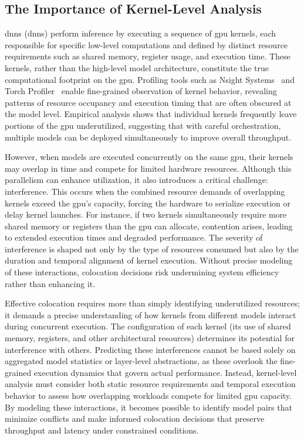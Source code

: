 \subsection{The Importance of Kernel-Level Analysis}

\acrlong{dnn}s (\acrshort{dnn}s) perform inference by executing a sequence of \acrshort{gpu} kernels, each responsible for specific low-level computations and defined by distinct resource requirements such as shared memory, register usage, and execution time. These kernels, rather than the high-level model architecture, constitute the true computational footprint on the \acrshort{gpu}. Profiling tools such as Nsight Systems~\cite{nsight_systems} and Torch Profiler~\cite{torch_profiler} enable fine-grained observation of kernel behavior, revealing patterns of resource occupancy and execution timing that are often obscured at the model level. Empirical analysis shows that individual kernels frequently leave portions of the \acrshort{gpu} underutilized, suggesting that with careful orchestration, multiple models can be deployed simultaneously to improve overall throughput.

However, when models are executed concurrently on the same \acrshort{gpu}, their kernels may overlap in time and compete for limited hardware resources. Although this parallelism can enhance utilization, it also introduces a critical challenge: interference. This occurs when the combined resource demands of overlapping kernels exceed the \acrshort{gpu}'s capacity, forcing the hardware to serialize execution or delay kernel launches. For instance, if two kernels simultaneously require more shared memory or registers than the \acrshort{gpu} can allocate, contention arises, leading to extended execution times and degraded performance. The severity of interference is shaped not only by the type of resources consumed but also by the duration and temporal alignment of kernel execution. Without precise modeling of these interactions, colocation decisions risk undermining system efficiency rather than enhancing it.

Effective colocation requires more than simply identifying underutilized resources; it demands a precise understanding of how kernels from different models interact during concurrent execution. The configuration of each kernel (its use of shared memory, registers, and other architectural resources) determines its potential for interference with others. Predicting these interferences cannot be based solely on aggregated model statistics or layer-level abstractions, as these overlook the fine-grained execution dynamics that govern actual performance. Instead, kernel-level analysis must consider both static resource requirements and temporal execution behavior to assess how overlapping workloads compete for limited \acrshort{gpu} capacity. By modeling these interactions, it becomes possible to identify model pairs that minimize conflicts and make informed colocation decisions that preserve throughput and latency under constrained conditions.

